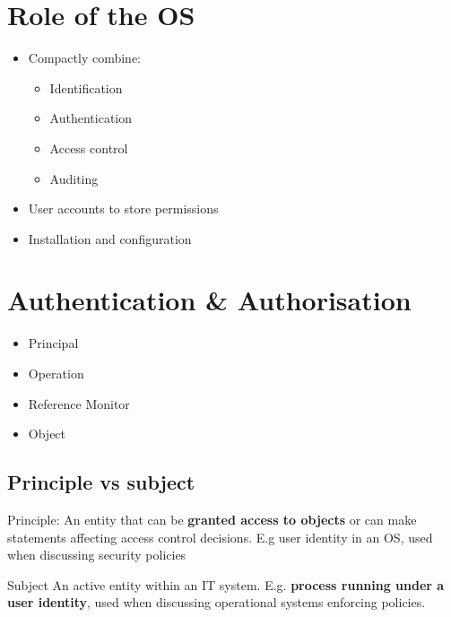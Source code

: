 \documentclass{article}
\begin{document}
\tableofcontents

\newpage

\section{Role of the OS}
\begin{itemize}
  \item Compactly combine: 
  \begin{itemize}
    \item Identification 
    \item Authentication 
    \item Access control 
    \item Auditing
  \end{itemize} 
  \item User accounts to store permissions 
  \item Installation and configuration
\end{itemize}

\section{Authentication & Authorisation}
\begin{itemize}
  \item Principal
  \item Operation
  \item Reference Monitor
  \item Object
\end{itemize}

\subsection{Principle vs subject}
\begin{flushleft}
Principle: An entity that can be \textbf{granted access to objects} or can make statements affecting access control decisions. E.g user identity in an OS, used when discussing security policies
\end{flushleft}
\begin{flushleft}
Subject An active entity within an IT system. E.g. \textbf{process running under a user identity}, used when discussing operational systems enforcing policies.
\end{flushleft}
\end{document}
